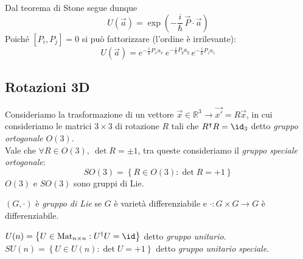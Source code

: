 Dal teorema di Stone segue dunque
\begin{equation}
    U(\vec a)=\exp\!\left(-\frac{i}{\hbar}\,\vec P\!\cdot\!\vec a\right)
\end{equation}
Poiché \([P_i,P_j]=0\) si può fattorizzare (l’ordine è irrilevante):
\[
U(\vec a)=e^{-\frac{i}{\hbar}P_x a_x}\,e^{-\frac{i}{\hbar}P_y a_y}\,e^{-\frac{i}{\hbar}P_z a_z}
\]


\subsection{Rotazioni 3D}

Consideriamo la trasformazione di un vettore \(\vec{x} \in \mathbb{R}^3 \to \vec{x'}= R\vec{x}\), in cui consideriamo le matrici \(3\times3\) di rotazione \(R \) tali che \(R^\intercal R = \id_3\) detto \textit{gruppo ortogonale} \(O(3)\).\\
Vale che \(\forall R \in O(3), \ \det R = \pm 1 \), tra queste consideriamo il \textit{gruppo speciale ortogonale}:
\begin{equation}
    SO(3)= \left\{ R \in O(3): \det R = +1 \right\}
\end{equation}
\(O(3)\) e \(SO(3)\) sono gruppi di Lie.

\begin{definition}
    \((G, \cdot )\) è \textit{gruppo di Lie} se \(G\) è varietà differenziabile e \(\cdot : G \times G \to G \) è differenziabile. 
\end{definition}

\begin{example}
    \(U(n)=\left\{ U \in \text{Mat}_{n\times n } : U^\dagger U = \id \right\}\) detto \textit{gruppo unitario}.\\
    \(SU(n) = \left\{ U \in U(n ) : \det U = +1 \right\}\) detto \textit{gruppo unitario speciale}.
\end{example}


